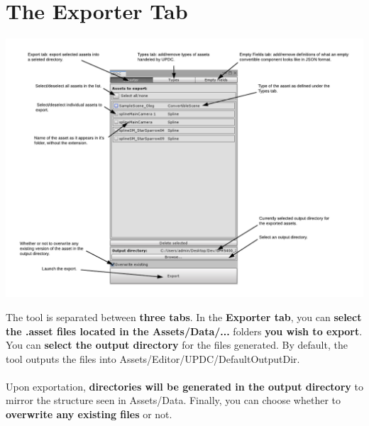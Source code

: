 \documentclass[10pt,a4paper]{article}
\begin{document}
\section{The Exporter Tab}
\begin{center}
\includegraphics[scale=0.55]{exportUi}
\end{center}
The tool is separated between \textbf{three tabs}. In the \textbf{Exporter tab}, you can \textbf{select the .asset files located in the Assets/Data/...} folders \textbf{you wish to export}.
You can \textbf{select the output directory} for the files generated. By default, the tool outputs the files into Assets/Editor/UPDC/DefaultOutputDir.\\\\
Upon exportation, \textbf{directories will be generated in the output directory} to mirror the structure seen in Assets/Data.
Finally, you can choose whether to \textbf{overwrite any existing files} or not.
\newpage
\end{document}
